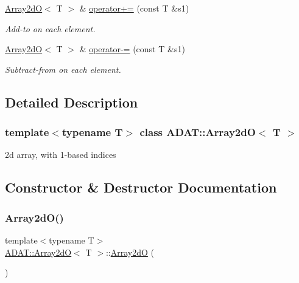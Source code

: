 \begin{DoxyCompactItemize}
\mbox{\hyperlink{classADAT_1_1Array2dO}{Array2dO}}$<$ T $>$ \& \mbox{\hyperlink{classADAT_1_1Array2dO_ae36484e0516c671683a97079f32bd6d8}{operator+=}} (const T \&s1)
\begin{DoxyCompactList}\small\item\em Add-\/to on each element. \end{DoxyCompactList}\item 
\mbox{\hyperlink{classADAT_1_1Array2dO}{Array2dO}}$<$ T $>$ \& \mbox{\hyperlink{classADAT_1_1Array2dO_a5facf357c8c8f28555fe851dce2d039c}{operator-\/=}} (const T \&s1)
\begin{DoxyCompactList}\small\item\em Subtract-\/from on each element. \end{DoxyCompactList}\end{DoxyCompactItemize}


\subsection{Detailed Description}
\subsubsection*{template$<$typename T$>$\newline
class A\+D\+A\+T\+::\+Array2d\+O$<$ T $>$}

2d array, with 1-\/based indices 

\subsection{Constructor \& Destructor Documentation}
\mbox{\label{classADAT_1_1Array2dO_ad54b38527daf48956f3de486768f11b0}} 
\subsubsection{\texorpdfstring{Array2dO()}{Array2dO()}\hspace{0.1cm}{\footnotesize\ttfamily [1/8]}}
{\footnotesize\ttfamily template$<$typename T$>$ \\
\mbox{\hyperlink{classADAT_1_1Array2dO}{A\+D\+A\+T\+::\+Array2dO}}$<$ T $>$\+::\mbox{\hyperlink{classADAT_1_1Array2dO}{Array2dO}} (\begin{DoxyParamCaption}{ }\end{DoxyParamCaption})\hspace{0.3cm}{\ttfamily [inline]}}

